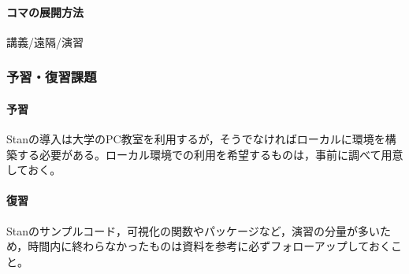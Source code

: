 \paragraph{コマの展開方法}
講義/遠隔/演習
\subsubsection{予習・復習課題}
\paragraph{予習} Stanの導入は大学のPC教室を利用するが，そうでなければローカルに環境を構築する必要がある。ローカル環境での利用を希望するものは，事前に調べて用意しておく。
\paragraph{復習} Stanのサンプルコード，可視化の関数やパッケージなど，演習の分量が多いため，時間内に終わらなかったものは資料を参考に必ずフォローアップしておくこと。